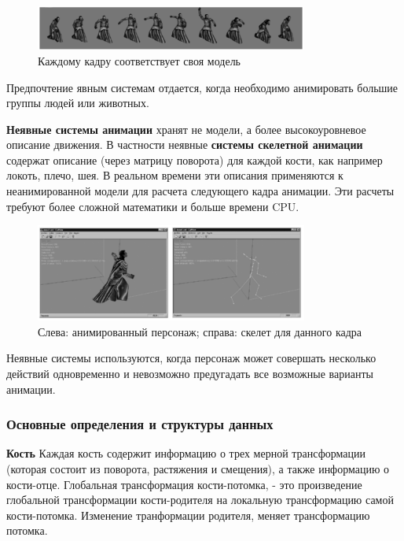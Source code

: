 \begin{figure}[h!]
    \centering
    \includegraphics[width=0.8\textwidth]{explicit_animation.png}
    \caption{Каждому кадру соответствует своя модель}
\end{figure}

Предпочтение явным системам отдается, когда необходимо анимировать большие группы людей или животных.

\textbf{Неявные системы анимации} хранят не модели, а более высокоуровневое описание движения.
В частности неявные \textbf{системы скелетной анимации} содержат описание (через матрицу поворота) для каждой кости, как например локоть, плечо, шея.
В реальном времени эти описания применяются к неанимированной модели для расчета следующего кадра анимации.
Эти расчеты требуют более сложной математики и больше времени CPU.


\begin{figure}[h!]
    \centering
    \includegraphics[width=0.8\textwidth]{implicit_animation.png}
    \caption{\small{Слева: анимированный персонаж; справа: скелет для данного кадра}}
\end{figure}

Неявные системы используются, когда персонаж может совершать несколько действий одновременно и невозможно предугадать все возможные варианты анимации.

\subsubsection{Основные определения и структуры данных}

\textbf{Кость}
Каждая кость содержит информацию о трех мерной трансформации (которая состоит из поворота, растяжения и смещения), а также информацию о кости-отце. Глобальная трансформация кости-потомка, - это произведение глобальной трансформации кости-родителя на локальную трансформацию самой кости-потомка. Изменение транформации родителя, меняет трансформацию потомка.

